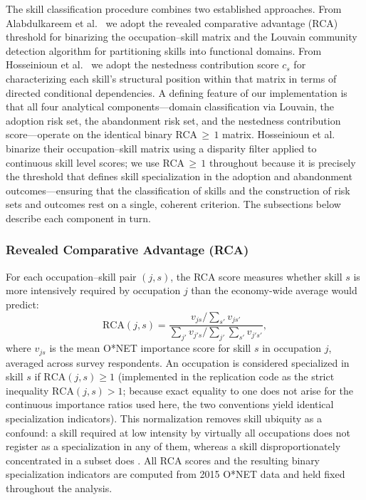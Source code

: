 \documentclass[11pt, letterpaper]{article} %
\newcommand{\parencite}[1]{\cite{#1}}
\begin{document}
The skill classification procedure combines two established approaches. From Alabdulkareem et al.~\parencite{alabdulkareem_unpacking_2018} we adopt the revealed comparative advantage (RCA) threshold for binarizing the occupation--skill matrix and the Louvain community detection algorithm for partitioning skills into functional domains. From Hosseinioun et al.~\parencite{hosseinioun_skill_2025} we adopt the nestedness contribution score $c_s$ for characterizing each skill's structural position within that matrix in terms of directed conditional dependencies. A defining feature of our implementation is that all four analytical components---domain classification via Louvain, the adoption risk set, the abandonment risk set, and the nestedness contribution score---operate on the identical 
binary RCA$\,{\geq}\,1$ matrix. Hosseinioun et al.~\parencite{hosseinioun_skill_2025} binarize their occupation--skill matrix using a disparity filter applied to continuous skill level scores; we use RCA$\,{\geq}\,1$ throughout because it is precisely the threshold that defines skill specialization in the adoption and abandonment outcomes---ensuring that the classification of skills and the construction of risk sets and outcomes rest on a single, coherent criterion. The subsections below describe each component in turn.
 
\subsubsection{Revealed Comparative Advantage (RCA)}
\label{sec:SI_rca}
 
For each occupation--skill pair $(j, s)$, the RCA score measures whether skill $s$ is more intensively required by occupation $j$ than the economy-wide average would predict:
%
\begin{equation*}
\mathrm{RCA}(j, s) = \frac{v_{js} / \sum_{s'} v_{js'}}{\sum_{j'} v_{j's} / \sum_{j'}\sum_{s'} v_{j's'}},
\end{equation*}
%
where $v_{js}$ is the mean O*NET importance score for skill $s$ in occupation $j$, averaged across survey respondents. An occupation is considered specialized in skill $s$ if $\mathrm{RCA}(j,s) \geq 1$ (implemented in the replication code as the strict inequality $\mathrm{RCA}(j,s) > 1$; because exact equality to one does not arise for the continuous importance ratios used here, the two conventions yield identical specialization indicators). This normalization removes skill ubiquity as a confound: a skill required at low intensity by virtually all occupations does not register as a specialization in any of them, whereas a skill disproportionately concentrated in a subset does \parencite{alabdulkareem_unpacking_2018}. All RCA scores and the resulting binary specialization indicators are computed from 2015 O*NET data and held fixed throughout the analysis.
 
\end{document}
